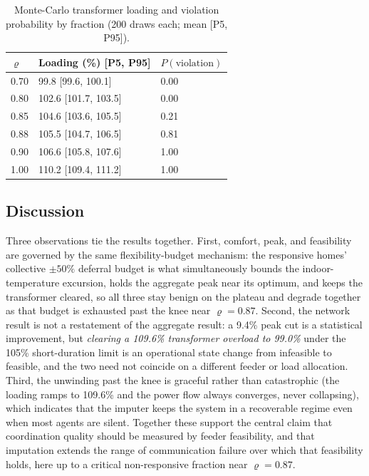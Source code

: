 \begin{table}[t]
\centering
\caption{Monte-Carlo transformer loading and violation probability by fraction
(200 draws each; mean [P5, P95]).}
\label{tab:uncertainty}
\begin{tabular}{@{}lll@{}}
\toprule
$\varrho$ & Loading (\%) [P5, P95] & $P(\text{violation})$ \\
\midrule
0.70 & 99.8 [99.6, 100.1]   & 0.00 \\
0.80 & 102.6 [101.7, 103.5] & 0.00 \\
0.85 & 104.6 [103.6, 105.5] & 0.21 \\
0.88 & 105.5 [104.7, 106.5] & 0.81 \\
0.90 & 106.6 [105.8, 107.6] & 1.00 \\
1.00 & 110.2 [109.4, 111.2] & 1.00 \\
\bottomrule
\end{tabular}
\end{table}

\subsection{Discussion}
Three observations tie the results together. First, comfort, peak, and feasibility
are governed by the same flexibility-budget mechanism: the responsive homes'
collective $\pm 50\%$ deferral budget is what simultaneously bounds the
indoor-temperature excursion, holds the aggregate peak near its optimum, and keeps
the transformer cleared, so all three stay benign on the plateau and degrade
together as that budget is exhausted past the knee near $\varrho = 0.87$. Second,
the network result is not a restatement of the aggregate result: a 9.4\% peak cut
is a statistical improvement, but \emph{clearing a 109.6\% transformer overload to
99.0\%} under the 105\% short-duration limit is an operational state change from
infeasible to feasible, and the two need not coincide on a different feeder or load
allocation. Third, the unwinding past the knee is graceful rather than catastrophic
(the loading ramps to 109.6\% and the power flow always converges, never
collapsing), which indicates that the imputer keeps the system in a recoverable
regime even when most agents are silent. Together these support the central claim
that coordination quality should be measured by feeder feasibility, and that
imputation extends the range of communication failure over which that feasibility
holds, here up to a critical non-responsive fraction near $\varrho = 0.87$.
